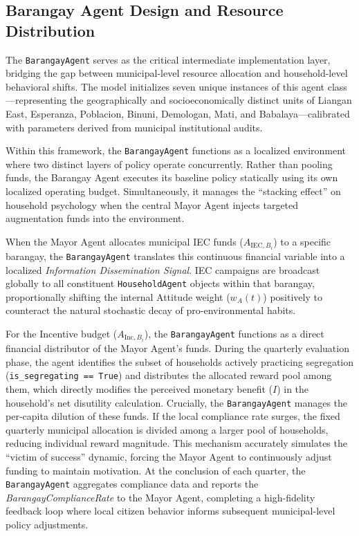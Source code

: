 \subsection{Barangay Agent Design and Resource Distribution}

The \texttt{BarangayAgent} serves as the critical intermediate implementation layer, bridging the gap between municipal-level resource allocation and household-level behavioral shifts. The model initializes seven unique instances of this agent class—representing the geographically and socioeconomically distinct units of Liangan East, Esperanza, Poblacion, Binuni, Demologan, Mati, and Babalaya—calibrated with parameters derived from municipal institutional audits. 

Within this framework, the \texttt{BarangayAgent} functions as a localized environment where two distinct layers of policy operate concurrently. Rather than pooling funds, the Barangay Agent executes its baseline policy statically using its own localized operating budget. Simultaneously, it manages the ``stacking effect'' on household psychology when the central Mayor Agent injects targeted augmentation funds into the environment.

When the Mayor Agent allocates municipal IEC funds ($A_{\mathrm{IEC}, B_i}$) to a specific barangay, the \texttt{BarangayAgent} translates this continuous financial variable into a localized \textit{Information Dissemination Signal}. IEC campaigns are broadcast globally to all constituent \texttt{HouseholdAgent} objects within that barangay, proportionally shifting the internal Attitude weight ($w_A(t)$) positively to counteract the natural stochastic decay of pro-environmental habits.

For the Incentive budget ($A_{\mathrm{Inc}, B_i}$), the \texttt{BarangayAgent} functions as a direct financial distributor of the Mayor Agent's funds. During the quarterly evaluation phase, the agent identifies the subset of households actively practicing segregation (\texttt{is\_segregating == True}) and distributes the allocated reward pool among them, which directly modifies the perceived monetary benefit ($I$) in the household's net disutility calculation. Crucially, the \texttt{BarangayAgent} manages the per-capita dilution of these funds. If the local compliance rate surges, the fixed quarterly municipal allocation is divided among a larger pool of households, reducing individual reward magnitude. This mechanism accurately simulates the ``victim of success'' dynamic, forcing the Mayor Agent to continuously adjust funding to maintain motivation. At the conclusion of each quarter, the \texttt{BarangayAgent} aggregates compliance data and reports the \textit{BarangayComplianceRate} to the Mayor Agent, completing a high-fidelity feedback loop where local citizen behavior informs subsequent municipal-level policy adjustments.

